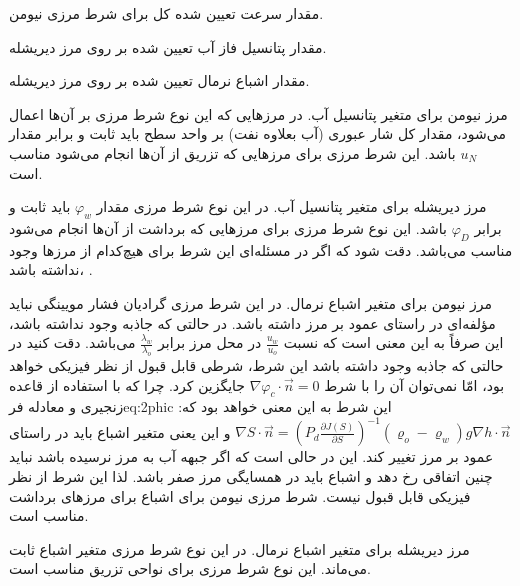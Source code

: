 \begin{tight_itemize}
\item[$u_N$]
مقدار سرعت تعیین شده کل برای شرط مرزی نیومن. 
\item[$\varphi_D$] 
مقدار پتانسیل فاز آب تعیین شده بر روی مرز دیریشله.
\item[$S_{D}$] 
مقدار اشباع نرمال تعیین شده بر روی مرز دیریشله.
\item[$\Gamma_{\varphi N}$] 
مرز نیومن برای متغیر پتانسیل آب. در مرزهایی که این نوع شرط مرزی بر آن‌ها اعمال می‌شود، مقدار کل شار عبوری (آب بعلاوه نفت) بر واحد سطح باید ثابت و برابر مقدار $u_N$ باشد. این شرط مرزی برای مرز‌هایی که تزریق از آن‌ها انجام می‌شود مناسب است.
\item[$\Gamma_{\varphi D}$] 
مرز دیریشله برای متغیر پتانسیل آب. در این نوع شرط مرزی مقدار $\varphi_w$ باید ثابت و برابر $\varphi_{D}$ باشد. این نوع شرط مرزی برای مرزهایی که برداشت از آن‌ها انجام می‌شود مناسب می‌باشد. دقت شود که اگر در مسئله‌ای این شرط برای هیچ‌کدام از مرز‌ها وجود نداشته باشد، .
\item[$\Gamma_{SN}$]  
مرز نیومن برای متغیر اشباع نرمال. در این شرط مرزی گرادیان فشار مویینگی نباید مؤلفه‌ای در راستای عمود بر مرز داشته باشد. در حالتی که جاذبه وجود نداشته باشد، این صرفاً به این معنی‌ است که نسبت 
$\frac{u_w}{u_o}$ در محل مرز برابر $\frac{\lambda_w}{\lambda_o}$  
می‌باشد. دقت کنید در حالتی که جاذبه وجود داشته باشد این شرط، شرطی قابل قبول از نظر فیزیکی خواهد بود، امّا نمی‌توان آن را با شرط 
$\nabla \varphi_c \cdot \vec n = 0$
جایگزین کرد. چرا که با استفاده از قاعده زنجیری و معادله ‌فر{eq:2phic} این شرط به این معنی خواهد بود که:
$\nabla S \cdot \vec n= \left( P_d\frac{\partial J(S)}{\partial S} \right)^{-1} (\varrho_o - \varrho_w)g \nabla h \cdot \vec n  $
و این یعنی متغیر اشباع باید در راستای عمود بر مرز تغییر کند. این در حالی است که اگر جبهه آب به مرز نرسیده باشد نباید چنین اتفاقی رخ دهد و اشباع باید در همسایگی مرز صفر باشد. لذا این شرط از نظر فیزیکی قابل قبول نیست. شرط مرزی نیومن برای اشباع  برای مرز‌های برداشت مناسب است.
\item[$\Gamma_{SD}$] 
مرز دیریشله برای متغیر اشباع نرمال. در این نوع شرط مرزی متغیر اشباع ثابت می‌ماند. این نوع شرط مرزی برای نواحی تزریق مناسب است. 
\end{tight_itemize}


